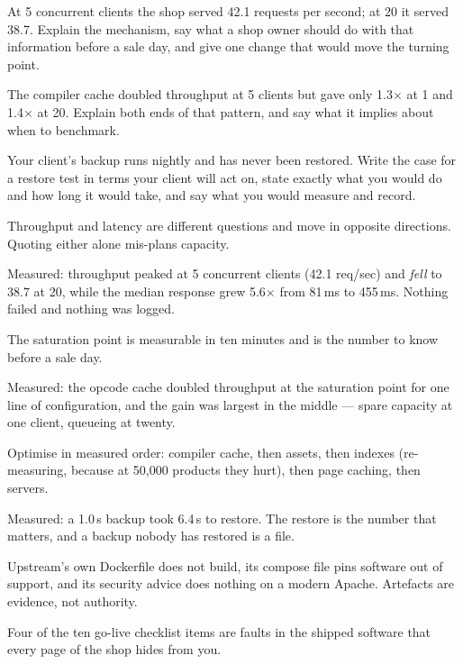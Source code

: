 \begin{checkpoint}
\begin{tightnum}
  \item At 5 concurrent clients the shop served 42.1 requests per second; at 20
        it served 38.7. Explain the mechanism, say what a shop owner should do
        with that information before a sale day, and give one change that would
        move the turning point.
  \item The compiler cache doubled throughput at 5 clients but gave only
        1.3$\times$ at 1 and 1.4$\times$ at 20. Explain both ends of that
        pattern, and say what it implies about when to benchmark.
  \item Your client's backup runs nightly and has never been restored. Write
        the case for a restore test in terms your client will act on, state
        exactly what you would do and how long it would take, and say what you
        would measure and record.
\end{tightnum}
\end{checkpoint}

\begin{chaptersummary}
\begin{tight}
  \item Throughput and latency are different questions and move in opposite
        directions. Quoting either alone mis-plans capacity.
  \item Measured: throughput peaked at 5 concurrent clients (42.1 req/sec) and
        \emph{fell} to 38.7 at 20, while the median response grew 5.6$\times$
        from 81\,ms to 455\,ms. Nothing failed and nothing was logged.
  \item The saturation point is measurable in ten minutes and is the number to
        know before a sale day.
  \item Measured: the opcode cache doubled throughput at the saturation point
        for one line of configuration, and the gain was largest in the middle
        --- spare capacity at one client, queueing at twenty.
  \item Optimise in measured order: compiler cache, then assets, then indexes
        (re-measuring, because at 50{,}000 products they hurt), then page
        caching, then servers.
  \item Measured: a 1.0\,s backup took 6.4\,s to restore. The restore is the
        number that matters, and a backup nobody has restored is a file.
  \item Upstream's own Dockerfile does not build, its compose file pins
        software out of support, and its security advice does nothing on a
        modern Apache. Artefacts are evidence, not authority.
  \item Four of the ten go-live checklist items are faults in the shipped
        software that every page of the shop hides from you.
\end{tight}
\end{chaptersummary}


